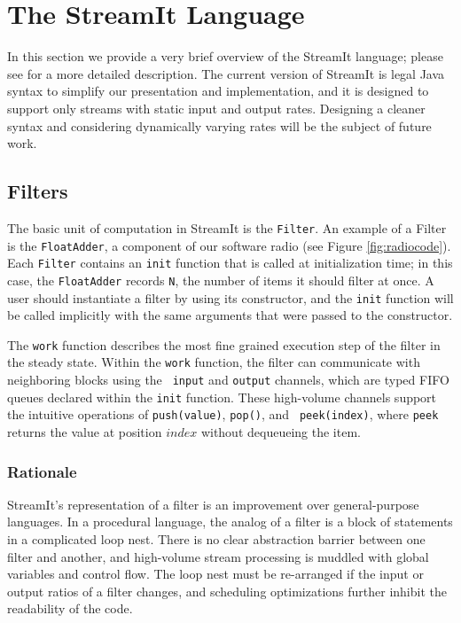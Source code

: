 \section{The StreamIt Language}
\label{sec:language}

In this section we provide a very brief overview of the StreamIt
language; please see \cite{streamittech} for a more detailed
description.  The current version of StreamIt is legal Java syntax to
simplify our presentation and implementation, and it is designed to
support only streams with static input and output rates.  Designing a
cleaner syntax and considering dynamically varying rates will be the
subject of future work.

\subsection{Filters}

The basic unit of computation in StreamIt is the {\tt Filter}.  An
example of a Filter is the {\tt FloatAdder}, a component of our
software radio (see Figure \ref{fig:radiocode}).  Each {\tt Filter}
contains an {\tt init} function that is called at initialization time;
in this case, the {\tt FloatAdder} records {\tt N}, the number of
items it should filter at once.  A user should instantiate a filter by
using its constructor, and the {\tt init} function will be called
implicitly with the same arguments that were passed to the
constructor.

The {\tt work} function describes the most fine grained execution step
of the filter in the steady state.  Within the {\tt work} function,
the filter can communicate with neighboring blocks using the {\tt
input} and {\tt output} channels, which are typed FIFO queues declared
within the {\tt init} function.  These high-volume channels support
the intuitive operations of {\tt push(value)}, {\tt pop()}, and {\tt
peek(index)}, where {\tt peek} returns the value at position $index$
without dequeueing the item.

\subsubsection{Rationale}

StreamIt's representation of a filter is an improvement over
general-purpose languages.  In a procedural language, the analog of a
filter is a block of statements in a complicated loop nest.  There is
no clear abstraction barrier between one filter and another, and
high-volume stream processing is muddled with global variables and
control flow. The loop nest must be re-arranged if the input or output
ratios of a filter changes, and scheduling optimizations further
inhibit the readability of the code.


